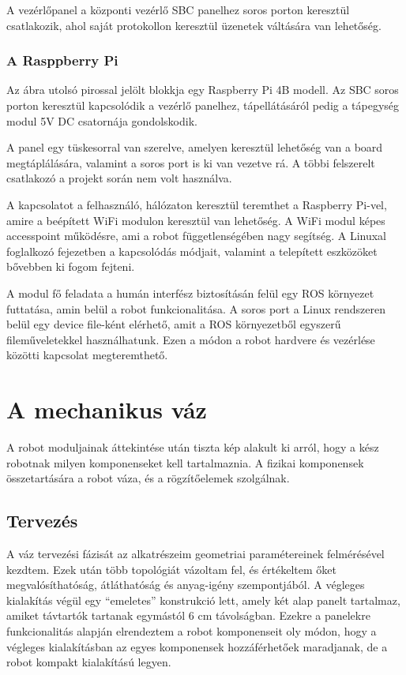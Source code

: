 A vezérlőpanel a központi vezérlő SBC panelhez soros porton keresztül
csatlakozik, ahol saját protokollon keresztül üzenetek váltására van lehetőség. 

\subsubsection{A Rasppberry Pi}

Az ábra utolsó pirossal jelölt blokkja egy Raspberry Pi 4B modell. Az SBC soros
porton keresztül kapcsolódik a vezérlő panelhez, tápellátásáról pedig a tápegység
modul 5V DC csatornája gondolskodik.

A panel egy tüskesorral van szerelve, amelyen keresztül lehetőség van a board
megtáplálására, valamint a soros port is ki van vezetve rá. A többi felszerelt
csatlakozó a projekt során nem volt használva.

\medskip

A kapcsolatot a felhasználó, hálózaton keresztül teremthet a Raspberry Pi-vel,
amire a beépített WiFi modulon keresztül van lehetőség. A WiFi modul képes
accesspoint működésre, ami a robot függetlenségében nagy segítség. A Linuxal
foglalkozó fejezetben a kapcsolódás módjait, valamint a telepített eszközöket
bővebben ki fogom fejteni.

\medskip

A modul fő feladata a humán interfész biztosításán felül egy ROS környezet
futtatása, amin belül a robot funkcionalitása. A soros port a Linux rendszeren
belül egy device file-ként elérhető, amit a ROS környezetből egyszerű
fileműveletekkel használhatunk. Ezen a módon a robot hardvere és vezérlése
közötti kapcsolat megteremthető.

\section{A mechanikus váz}

A robot moduljainak áttekintése után tiszta kép alakult ki arról, hogy a kész
robotnak milyen komponenseket kell tartalmaznia. A fizikai komponensek
összetartására a robot váza, és a rögzítőelemek szolgálnak. 

\subsection{Tervezés}

A váz tervezési fázisát az alkatrészeim geometriai paramétereinek felmérésével
kezdtem. Ezek után több topológiát vázoltam fel, és értékeltem őket
megvalósíthatóság, átláthatóság és anyag-igény szempontjából. A végleges
kialakítás végül egy ``emeletes'' konstrukció lett, amely két alap panelt
tartalmaz, amiket távtartók tartanak egymástól 6 cm távolságban. Ezekre a
panelekre funkcionalitás alapján elrendeztem a robot komponenseit oly módon, hogy
a végleges kialakításban az egyes komponensek hozzáférhetőek maradjanak, de a
robot kompakt kialakítású legyen.

